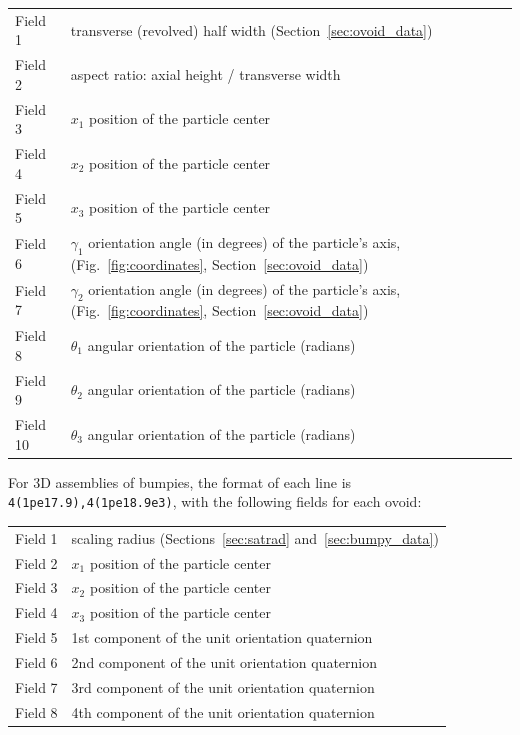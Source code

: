 \documentclass[letterpaper,11pt]{article}
\begin{document}
\begin{center}
\begin{tabular}{lp{3.5in}}
Field 1 & transverse (revolved) half width (Section~\ref{sec:ovoid_data})\\
Field 2 & aspect ratio:  axial height / transverse width \\
Field 3 & $x_{1}$ position of the particle center\\
Field 4 & $x_{2}$ position of the particle center\\
Field 5 & $x_{3}$ position of the particle center\\
Field 6 & $\gamma_{1}$ orientation angle (in degrees) of
the particle's axis,
(Fig.~\ref{fig:coordinates}, Section~\ref{sec:ovoid_data})\\
Field 7 & $\gamma_{2}$ orientation angle (in degrees) of
the particle's axis,
(Fig.~\ref{fig:coordinates}, Section~\ref{sec:ovoid_data})\\
Field 8 & $\theta_{1}$ angular orientation of the particle (radians)\\
Field 9 & $\theta_{2}$ angular orientation of the particle (radians)\\
Field 10 & $\theta_{3}$ angular orientation of the particle (radians)
\end{tabular}
\end{center}
\par
For 3D assemblies of bumpies,
the format of each line is \texttt{4(1pe17.9),4(1pe18.9e3)}, with
the following fields
for each ovoid:\\
\begin{center}
\begin{tabular}{lp{3.5in}}
Field 1 & scaling radius (Sections~\ref{sec:satrad} 
          and~\ref{sec:bumpy_data})\\
Field 2 & $x_{1}$ position of the particle center\\
Field 3 & $x_{2}$ position of the particle center\\
Field 4 & $x_{3}$ position of the particle center\\
Field 5 & 1st component of the unit orientation quaternion\\
Field 6 & 2nd component of the unit orientation quaternion\\
Field 7 & 3rd component of the unit orientation quaternion\\
Field 8 & 4th component of the unit orientation quaternion
\end{tabular}
\end{center}
%
\end{document}
